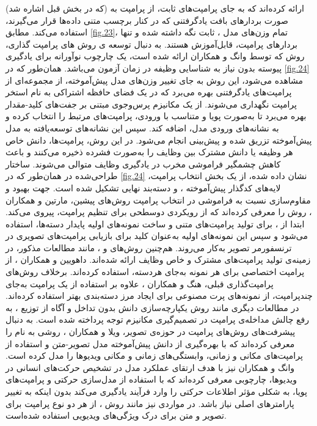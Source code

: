 (که در بخش قبل اشاره شد) ارائه کرده‌اند که به جای پرامپت‌های ثابت، از پرامپت به صورت بردارهای بافت یادگرفتنی
که در کنار برچسب متنی داده‌ها قرار می‌گیرند، استفاده می‌کند. مطابق 
\cref{fig.23}،
تمام وزن‌های مدل 
،
ثابت نگه داشته شده و تنها بردارهای پرامپت، قابل‌آموزش هستند. به دنبال توسعه ی روش های پرامپت گذاری، روش
که توسط وانگ و همکاران
\cite{l2p}
ارائه شده است، یک چارچوب نوآورانه برای یادگیری پیوسته بدون نیاز به شناسایی وظیفه در زمان آزمون می‌باشد. همان‌طور که در 
\cref{fig.24}
مشاهده می‌شود، این روش به جای تغییر وزن‌های مدل پیش‌آموخته، از مجموعه‌ای از پرامپت‌های یادگرفتنی بهره می‌برد که در یک فضای حافظه اشتراکی به نام استخر پرامپت
نگهداری می‌شوند. 
از یک مکانیزم پرس‌وجوی مبتنی بر جفت‌های کلید-مقدار بهره می‌برد تا به‌صورت پویا و متناسب با ورودی، پرامپت‌های مرتبط را انتخاب کرده و به نشانه‌‌های ورودی مدل، اضافه کند. سپس این نشانه‌‌های توسعه‌یافته به مدل پیش‌آموخته تزریق شده و پیش‌بینی انجام می‌شود.
در این روش، پرامپت‌ها، دانش خاص هر وظیفه یا دانش مشترک بین وظایف را به‌صورت فشرده ذخیره می‌کنند و باعث کاهش چشمگیر فراموشی مخرب در یادگیری وظایف متوالی می‌شوند. ساختار طراحی‌شده در  
همان‌طور که در 
\cref{fig.24}
نشان داده شده، از یک بخش انتخاب پرامپت، لایه‌های کدگذار پیش‌آموخته
،
و دسته‌بند نهایی تشکیل شده است. جهت بهبود و مقاوم‌سازی نسبت به فراموشی در انتخاب پرامپت روش‌های پیشین، مارتین و همکاران
\cite{starprompt}،
روش 
را معرفی کرده‌اند که از رویکردی دوسطحی برای تنظیم پرامپت، پیروی می‌کند. ابتدا از 
،
برای تولید پرامپت‌های متنی و ساخت نمونه‌های‌ اولیه
پایدار دسته‌ها، استفاده می‌شود و سپس این نمونه‌های اولیه به‌عنوان کلید برای بازیابی پرامپت‌های تصویری در ترنسفورمر تصویر به‌کار می‌روند. هم‌چنین روش‌های
\cite{dual-prompt}
و 
\cite{h-prompts}،
مانند مطالعات مذکور، در زمینه‌ی تولید پرامپت‌های مشترک و خاص وظایف ارائه شده‌اند. داهویین و همکاران
\cite{instance_prompt}،
از پرامپت اختصاصی برای هر نمونه به‌جای هر‌دسته، استفاده کرده‌اند. برخلاف روش‌های پرامپت‌گذاری قبلی، هنگ و همکاران
\cite{ovor}،
علاوه بر استفاده از یک پرامپت به‌جای چندپرامپت، از نمونه‌های پرت مصنوعی برای ایجاد مرز دسته‌بندی بهتر استفاده کرده‌اند. در مطالعات دیگری مانند روش یکپارچه‌سازی دانش بدون تداخل و آگاه از توزیع
\cite{diki}
،
به رفع چالش مداخله‌ی پرامپت در تصمیم‌گیری مکانیزم توجه پرداخته شده است. به دنبال پیشرفت‌های روش‌های پرامپت در حوزه‌ی تصویر، ویلا و همکاران
\cite{pivot}،
روشی به نام
را معرفی کرده‌اند که با بهره‌گیری از دانش پیش‌آموخته مدل‌ تصویر-متن
و استفاده از پرامپت‌های مکانی
و زمانی، وابستگی‌های زمانی و مکانی ویدیوها را مدل کرده است. وانگ و همکاران \cite{clip-poolprompt} نیز با هدف ارتقای عملکرد مدل  در تشخیص حرکت‌های انسانی در ویدیوها، چارچوبی معرفی کرده‌اند که با استفاده از مدل‌سازی حرکتی و پرامپت‌های پویا، به شکلی مؤثر اطلاعات حرکتی را وارد فرآیند یادگیری می‌کند بدون اینکه به تغییر پارامترهای اصلی  نیاز باشد. در مواردی نیز مانند روش  
\cite{vilt-clip}،
از هر دو نوع پرامپت برای تصویر و متن برای درک ویژگی‌های ویدیویی استفاده شده‌است.

